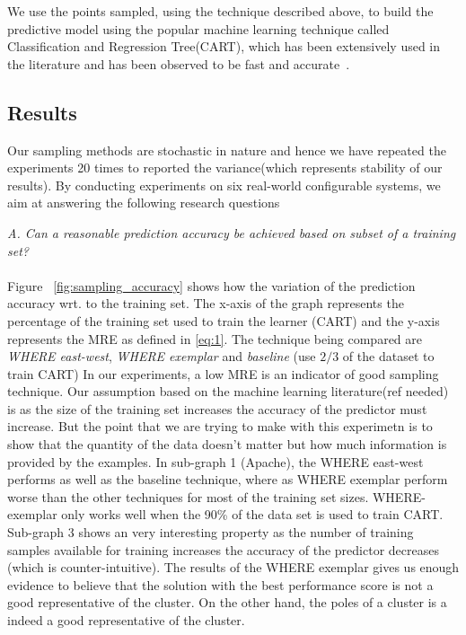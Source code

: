 \documentclass{sig-alternative}
\begin{document}
We use the points sampled, using the technique described above, to build the predictive model using the popular machine learning technique called Classification and Regression Tree(CART), which has been extensively used in the literature and has been observed to be fast and accurate~\cite{guo2013variability}.

\subsection{Results}
Our sampling methods are stochastic in nature and hence we have repeated the experiments 20 times to reported the variance(which represents stability of our results). By conducting experiments on six real-world configurable systems, we aim at answering the following research questions

\textit{A. Can a reasonable prediction accuracy be achieved based on subset of a training set?}\\
\\
Figure ~\ref{fig:sampling_accuracy} shows how the variation of the  prediction accuracy wrt. to the training set. The x-axis of the graph represents the percentage of the training set used to train the learner (CART) and the y-axis represents the MRE as defined in \ref{eq:1}. The technique being compared are \textit{WHERE east-west}, \textit{WHERE exemplar} and \textit{baseline} (use $2/3$ of the dataset to train CART) In our experiments, a low MRE is an indicator of good sampling technique. Our assumption based on the machine learning literature(ref needed) is as the size of the training set increases the accuracy of the predictor must increase. But the point that we are trying to make with this experimetn is to show that the quantity of the data doesn't matter but how much information is provided by the examples. In sub-graph 1 (Apache), the WHERE east-west performs as well as the baseline technique, where as WHERE exemplar perform worse than the other techniques for most of the training set sizes. WHERE-exemplar only works well when the 90\% of the data set is used to train CART. Sub-graph 3 shows an very interesting property as the number of training samples available for training increases the accuracy of the predictor decreases (which is counter-intuitive). The results of the WHERE exemplar gives us enough evidence to believe that the solution with the best performance score is not a good representative of the cluster. On the other hand, the poles of a cluster is a indeed a good representative of the cluster.\\~\\
\end{document}
